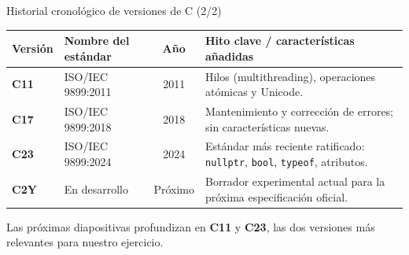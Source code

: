 \documentclass[aspectratio=169]{beamer}
\begin{document}
\begin{frame}{Historial cronológico de versiones de C (2/2)}
    \small
    \begin{table}
        \begin{tabularx}{\textwidth}{l p{2.8cm} c X}
            \toprule
            \textbf{Versión} & \textbf{Nombre del estándar} & \textbf{Año} & \textbf{Hito clave / características añadidas} \\
            \midrule
            \textbf{C11} & ISO/IEC 9899:2011 & 2011 & Hilos (multithreading), operaciones atómicas y Unicode. \\
            \addlinespace
            \textbf{C17} & ISO/IEC 9899:2018 & 2018 & Mantenimiento y corrección de errores; sin características nuevas. \\
            \addlinespace
            \textbf{C23} & ISO/IEC 9899:2024 & 2024 & Estándar más reciente ratificado: \texttt{nullptr}, \texttt{bool}, \texttt{typeof}, atributos. \\
            \addlinespace
            \textbf{C2Y} & En desarrollo & Próximo & Borrador experimental actual para la próxima especificación oficial. \\
            \bottomrule
        \end{tabularx}
    \end{table}

    \vspace{1em}
    \small Las próximas diapositivas profundizan en \textbf{C11} y \textbf{C23},
    las dos versiones más relevantes para nuestro ejercicio.
\end{frame}
\end{document}
